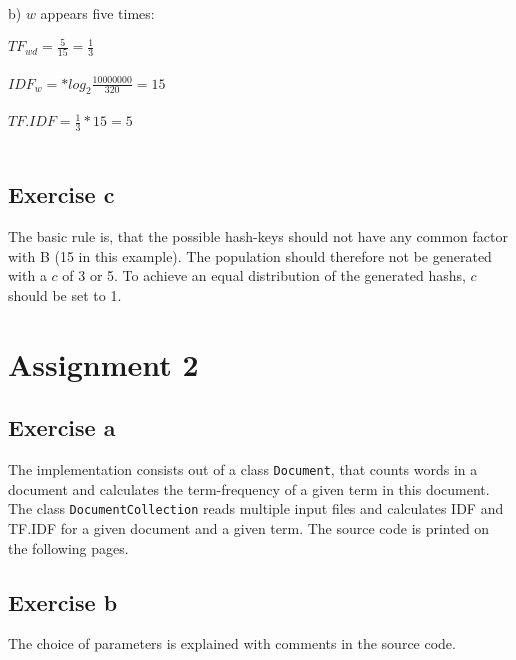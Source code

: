 \documentclass[]{scrartcl}
\begin{document}
b) $w$ appears five times: \\
\begin{addmargin}[25pt]{0pt} 
$TF_{wd} = \frac{5}{15} = \frac{1}{3}$\\\\
$IDF_w = * log_2\frac{10000000}{320} = 15$\\\\
$TF.IDF = \frac{1}{3} * 15 = 5$\\\\
\end{addmargin}

\subsection*{Exercise c}

The basic rule is, that the possible hash-keys should not have any common factor with B (15 in this example). The population should therefore not be generated with a $c$ of 3 or 5. To achieve an equal distribution of the generated hashs, $c$ should be set to 1.

\section*{Assignment 2}

\subsection*{Exercise a}

The implementation consists out of a class \texttt{Document}, that counts words in a document and calculates the term-frequency of a given term in this document. The class \texttt{DocumentCollection} reads multiple input files and calculates IDF and TF.IDF for a given document and a given term. The source code is printed on the following pages.

\subsection*{Exercise b}
The choice of parameters is explained with comments in the source code.
\end{document}
